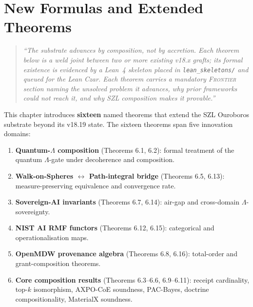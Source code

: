 
\chapter{New Formulas and Extended Theorems}
\label{chap:new-formulas}

\begin{quotation}
\noindent
\emph{``The substrate advances by composition, not by accretion.
Each theorem below is a weld joint between two or more existing v18.x
grafts; its formal existence is evidenced by a Lean~4 skeleton placed in
\texttt{lean\_skeletons/} and queued for the Lean Czar.  Each theorem
carries a mandatory \textsc{Frontier} section naming the unsolved problem
it advances, why prior frameworks could not reach it, and why SZL
composition makes it provable.''}
\end{quotation}

\medskip

\noindent
This chapter introduces \textbf{sixteen} named theorems that extend the
SZL Ouroboros substrate beyond its v18.19 state.  The sixteen theorems
span five innovation domains:

\begin{enumerate}
  \item \textbf{Quantum-$\Lambda$ composition} (Theorems 6.1, 6.2):
        formal treatment of the quantum \(\Lambda\)-gate under decoherence and
        composition.
  \item \textbf{Walk-on-Spheres $\leftrightarrow$ Path-integral bridge}
        (Theorems 6.5, 6.13): measure-preserving equivalence and
        convergence rate.
  \item \textbf{Sovereign-AI invariants} (Theorems 6.7, 6.14):
        air-gap and cross-domain \(\Lambda\)-sovereignty.
  \item \textbf{NIST AI RMF functors} (Theorems 6.12, 6.15):
        categorical and operationalisation maps.
  \item \textbf{OpenMDW provenance algebra} (Theorems 6.8, 6.16):
        total-order and grant-composition theorems.
  \item \textbf{Core composition results} (Theorems 6.3--6.6,
        6.9--6.11): receipt cardinality, top-$k$ isomorphism, AXPO-CoE
        soundness, PAC-Bayes, doctrine compositionality, MaterialX
        soundness.
\end{enumerate}

